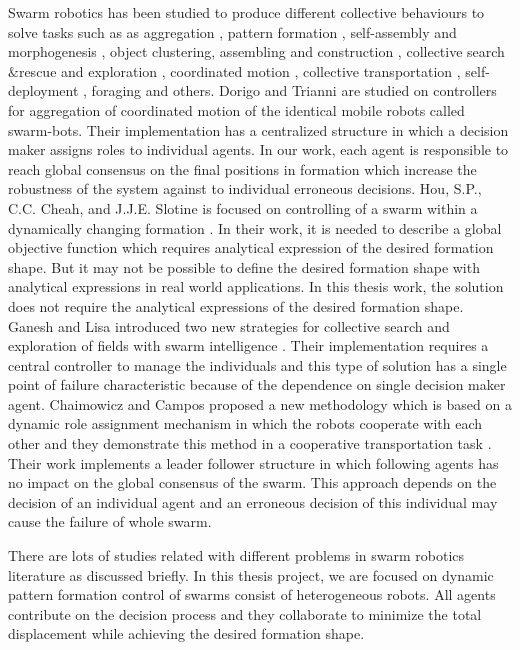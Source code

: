 Swarm robotics has been studied to produce different collective behaviours to solve tasks such as as aggregation , pattern formation , self-assembly and morphogenesis , object clustering, assembling and construction , collective search$\&$rescue and exploration , coordinated motion , collective transportation , self-deployment , foraging and others\cite{5}. Dorigo and Trianni \cite{7} are studied on controllers for aggregation of coordinated motion of the identical mobile robots called swarm-bots. Their implementation has a centralized structure in which a decision maker assigns roles to individual agents. In our work, each agent is responsible to reach global consensus on the final positions in formation which increase the robustness of the system against to individual erroneous decisions. Hou, S.P., C.C. Cheah, and J.J.E. Slotine is focused on controlling of a swarm within a dynamically changing formation \cite{8}. In their work, it is needed to describe a global objective function which requires analytical expression of the desired formation shape. But it may not be possible to define the desired formation shape with analytical expressions in real world applications. In this thesis work, the solution does not require the analytical expressions of the desired formation shape.  Ganesh and Lisa introduced two new strategies for collective search and exploration of fields with swarm intelligence \cite{9}. Their implementation requires a central controller to manage the individuals and this type of solution has a single point of failure characteristic because of the dependence on single decision maker agent.   Chaimowicz and Campos proposed a new methodology which is based on a dynamic role assignment mechanism in which the robots cooperate with each other and they demonstrate this method in a cooperative transportation task \cite{10}. Their work implements a leader follower structure in which following agents has no impact on the global consensus of the swarm. This approach depends on the decision of an individual agent and an erroneous decision of this individual may cause the failure of whole swarm. 

There are lots of studies related with different problems in swarm robotics literature as discussed briefly. In this thesis project, we are focused on dynamic pattern formation control of swarms consist of heterogeneous robots. All agents contribute on the decision process and they collaborate to minimize the total displacement while achieving the desired formation shape. 

